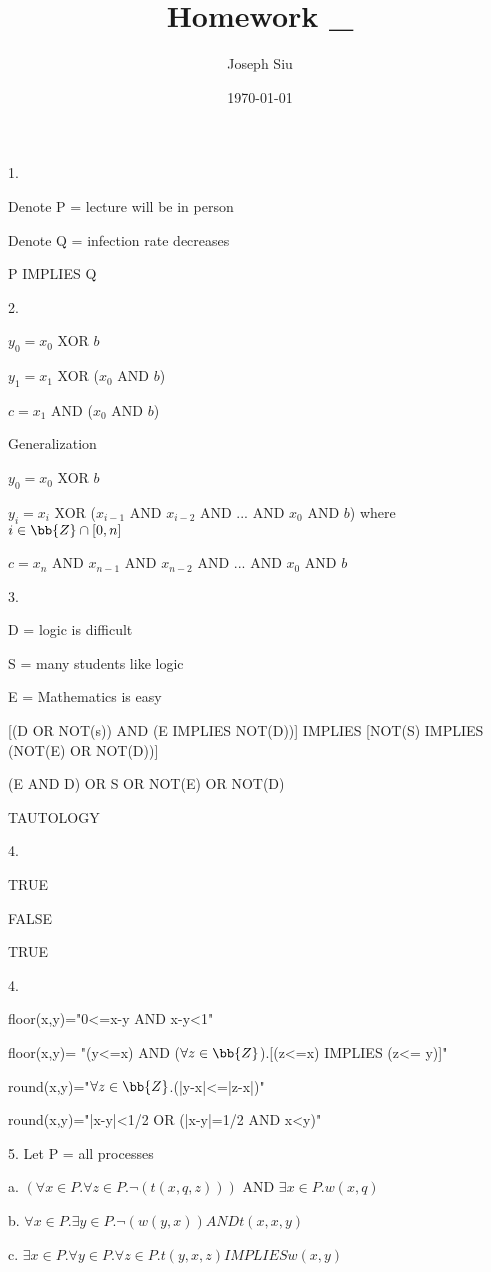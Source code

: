 \documentclass{homework}
\author{Joseph Siu}
\date{\today}
\title{Homework _}
\newcommand{\Z}{\bb{Z}} %
\newcommand{\?}{\stackrel{?}{=}}
\theoremstyle{definition}
\begin{document}
 \maketitle

1.

Denote P = lecture will be in person

Denote Q = infection rate decreases

P IMPLIES Q

2.

$y_0=x_0$ XOR $b$

$y_1=x_1$ XOR ($x_0$ AND $b$)

$c=x_1$ AND ($x_0$ AND $b$)

Generalization

$y_0=x_0$ XOR $b$

$y_i=x_i$ XOR ($x_{i-1}$ AND $x_{i-2}$ AND ... AND $x_{0}$ AND $b$) where $i\in \Z\cap[0,n]$

$c=x_n$ AND $x_{n-1}$ AND $x_{n-2}$ AND ... AND $x_{0}$ AND $b$

3.

D = logic is difficult

S = many students like logic

E = Mathematics is easy

[(D OR NOT(s)) AND (E IMPLIES NOT(D))] IMPLIES [NOT(S) IMPLIES (NOT(E) OR NOT(D))]

(E AND D) OR S OR NOT(E) OR NOT(D)

TAUTOLOGY

4.

TRUE

FALSE

TRUE

4.

floor(x,y)="0<=x-y AND x-y<1"

floor(x,y)= "(y<=x) AND ($\forall z\in\Z$).[(z<=x) IMPLIES (z<= y)]"

round(x,y)="$\forall z\in\Z$.(|y-x|<=|z-x|)"

round(x,y)="|x-y|<1/2 OR (|x-y|=1/2 AND x<y)"

5. Let P = all processes

a. $(\forall x \in P. \forall z \in P. \neg(t(x,q,z)))$ AND $\exists x\in P. w(x,q)$

b. $\forall x \in P. \exists y \in P. \neg(w(y,x)) AND t(x,x,y)$

c. $\exists x \in P. \forall y \in P. \forall z \in P. t(y,x,z) IMPLIES w(x,y)$
\end{document}
